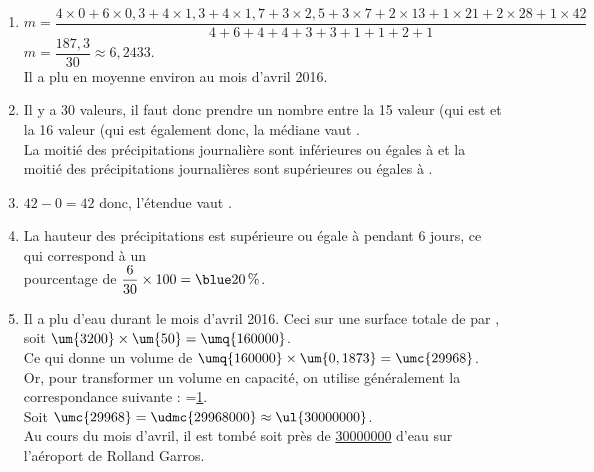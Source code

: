 \ \\ [-5mm]
   \begin{enumerate}
      \item $m =\dfrac{4\times0+6\times0,3+4\times1,3+4\times1,7+3\times2,5+3\times7+2\times13+1\times21+2\times28+1\times42}{4+6+4+4+3+3+1+1+2+1}$ \\ [2mm]
         $m =\dfrac{187,3}{30} \approx6,2433$. \\ [2mm]
         {\blue Il a plu en moyenne environ  au mois d'avril 2016}.
      \item Il y a 30 valeurs, il faut donc prendre un nombre entre la 15 valeur (qui est  et la 16 valeur (qui est également  donc, {\blue la médiane vaut }. \\
         La moitié des précipitations journalière sont inférieures ou égales à  et la moitié des précipitations journalières sont supérieures ou égales à .
      \item $42-0 =42$ donc, {\blue l'étendue vaut }.
      \item La hauteur des précipitations est supérieure ou égale à  {\blue pendant 6 jours}, ce qui correspond à un \\ [1mm]
         pourcentage de $\dfrac{6}{30}\times100 ={\blue 20\,\%}$. \\ [1mm]
      \item Il a plu  d'eau durant le mois d'avril 2016. Ceci sur une surface totale de  par , soit $\um{3200}\times\um{50} =\umq{160000}$. \\
         Ce qui donne un volume de $\umq{160000}\times\um{0,1873} =\umc{29968}$. \\
         Or, pour transformer un volume en capacité, on utilise généralement la correspondance suivante :    =\ul{1}. \\
         Soit $\umc{29968} =\udmc{29968000} \approx \ul{30000000}$. \\
         {\blue Au cours du mois d'avril, il est tombé  soit près de \ul{30000000} d'eau sur l'aéroport de Rolland Garros}. \\ [5mm]
   \end{enumerate}
